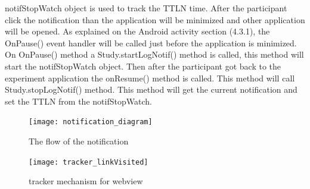 notifStopWatch object is used to track the TTLN time. After the participant click the notification than the application will be minimized and other
application will be opened. As explained on the Android activity section (4.3.1), the OnPause() event handler will be called just before the application is minimized.
On OnPause() method a Study.startLogNotif() method is called, this method will start the notifStopWatch object.
Then after the participant got back to the experiment application the onResume() method is called. This method will call Study.stopLogNotif() method.
This method will get the current notification and set the TTLN from the notifStopWatch.
\cite{Kliegel1984}


\begin{figure}
\begin{center}
\texttt{[image: notification\_diagram]}
\end{center}
\caption{The flow of the notification}
\label{fig:NotificationFlo}
\end{figure}

\begin{figure}
\begin{center}
\texttt{[image: tracker\_linkVisited]}
\end{center}
\caption{tracker mechanism for webview}
\label{fig:webViewTrack}
\end{figure}
